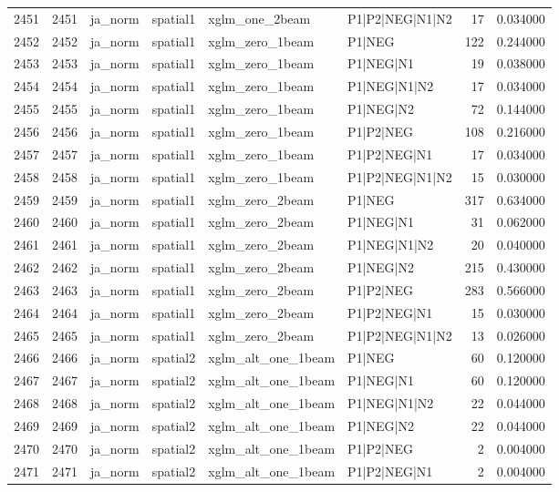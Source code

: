 \begin{tabular}{lrllllrr}
2451 & 2451 & ja_norm & spatial1 & xglm_one_2beam & P1|P2|NEG|N1|N2 & 17 & 0.034000 \\
2452 & 2452 & ja_norm & spatial1 & xglm_zero_1beam & P1|NEG & 122 & 0.244000 \\
2453 & 2453 & ja_norm & spatial1 & xglm_zero_1beam & P1|NEG|N1 & 19 & 0.038000 \\
2454 & 2454 & ja_norm & spatial1 & xglm_zero_1beam & P1|NEG|N1|N2 & 17 & 0.034000 \\
2455 & 2455 & ja_norm & spatial1 & xglm_zero_1beam & P1|NEG|N2 & 72 & 0.144000 \\
2456 & 2456 & ja_norm & spatial1 & xglm_zero_1beam & P1|P2|NEG & 108 & 0.216000 \\
2457 & 2457 & ja_norm & spatial1 & xglm_zero_1beam & P1|P2|NEG|N1 & 17 & 0.034000 \\
2458 & 2458 & ja_norm & spatial1 & xglm_zero_1beam & P1|P2|NEG|N1|N2 & 15 & 0.030000 \\
2459 & 2459 & ja_norm & spatial1 & xglm_zero_2beam & P1|NEG & 317 & 0.634000 \\
2460 & 2460 & ja_norm & spatial1 & xglm_zero_2beam & P1|NEG|N1 & 31 & 0.062000 \\
2461 & 2461 & ja_norm & spatial1 & xglm_zero_2beam & P1|NEG|N1|N2 & 20 & 0.040000 \\
2462 & 2462 & ja_norm & spatial1 & xglm_zero_2beam & P1|NEG|N2 & 215 & 0.430000 \\
2463 & 2463 & ja_norm & spatial1 & xglm_zero_2beam & P1|P2|NEG & 283 & 0.566000 \\
2464 & 2464 & ja_norm & spatial1 & xglm_zero_2beam & P1|P2|NEG|N1 & 15 & 0.030000 \\
2465 & 2465 & ja_norm & spatial1 & xglm_zero_2beam & P1|P2|NEG|N1|N2 & 13 & 0.026000 \\
2466 & 2466 & ja_norm & spatial2 & xglm_alt_one_1beam & P1|NEG & 60 & 0.120000 \\
2467 & 2467 & ja_norm & spatial2 & xglm_alt_one_1beam & P1|NEG|N1 & 60 & 0.120000 \\
2468 & 2468 & ja_norm & spatial2 & xglm_alt_one_1beam & P1|NEG|N1|N2 & 22 & 0.044000 \\
2469 & 2469 & ja_norm & spatial2 & xglm_alt_one_1beam & P1|NEG|N2 & 22 & 0.044000 \\
2470 & 2470 & ja_norm & spatial2 & xglm_alt_one_1beam & P1|P2|NEG & 2 & 0.004000 \\
2471 & 2471 & ja_norm & spatial2 & xglm_alt_one_1beam & P1|P2|NEG|N1 & 2 & 0.004000 \\

\end{tabular}

